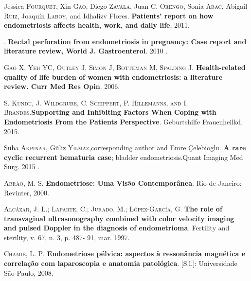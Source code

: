 \documentclass[12pt]{article} %
\begin{document}
\vspace{0,5cm}

Jessica\textsc{ Fourquet}, Xin\textsc{ Gao}, Diego\textsc{ Zavala}, Juan C. \textsc{Orengo}, Sonia\textsc{ Abac}, Abigail\textsc{ Ruiz}, Joaquín\textsc{ Laboy}, and Idhalizv{ Flores}.\textbf{ Patients’ report on how endometriosis affects health, work, and daily life}, 2011.

\vspace{0,5cm}

. \textbf{Rectal perforation from endometriosis in pregnancy: Case report and literature review, World J. Gastroenterol}. 2010 .

\vspace{0,5cm}

\textsc{Gao X, Yeh YC, Outley J, Simon J, Botteman M, Spalding J}. \textbf{Health-related quality of life burden of women with endometriosis: a literature review. Curr Med Res Opin}. 2006.

\vspace{0,5cm}

\textsc{S. Kundu, J. Wildgrube, C. Schippert, P. Hillemanns, and I. Brandes}.\textbf{Supporting and Inhibiting Factors When Coping with Endometriosis From the Patients Perspective}. Geburtshilfe Frauenheilkd. 2015.

\vspace{0,5cm}

Süha\textsc{ Akpınar}, Güliz \textsc{Yılmaz},corresponding author and Emre Çelebioglu.\textbf{ A rare cyclic recurrent hematuria case}; bladder endometriosis.Quant Imaging Med Surg. 2015 .

\vspace{0,5cm}

\textsc{Abrão, M. S}.\textbf{ Endometriose: Uma Visão Contemporânea}. Rio de Janeiro: Revinter, 2000.

\vspace{0,5cm}

\textsc{Alcázar, J. L.; Laparte, C.; Jurado, M.; López-García, G}.\textbf{ The role of transvaginal ultrasonography combined with color velocity imaging and pulsed Doppler in the diagnosis of endometrioma}. Fertility and sterility, v. 67, n. 3, p. 487- 91, mar. 1997.

\vspace{0,5cm}

\textsc{Chamié, L. P}.\textbf{ Endometriose pélvica: aspectos à ressonância magnética e correlação com laparoscopia e anatomia patológica}. [S.l.]: Universidade São Paulo, 2008.
\end{document}
